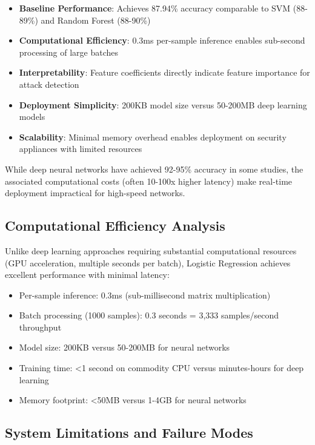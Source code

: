 \documentclass[conference]{IEEEtran}
\begin{document}
\begin{itemize}
    \item \textbf{Baseline Performance}: Achieves 87.94\% accuracy comparable to SVM (88-89\%) and Random Forest (88-90\%)
    \item \textbf{Computational Efficiency}: 0.3ms per-sample inference enables sub-second processing of large batches
    \item \textbf{Interpretability}: Feature coefficients directly indicate feature importance for attack detection
    \item \textbf{Deployment Simplicity}: 200KB model size versus 50-200MB deep learning models
    \item \textbf{Scalability}: Minimal memory overhead enables deployment on security appliances with limited resources
\end{itemize}

While deep neural networks have achieved 92-95\% accuracy in some studies, the associated computational costs (often 10-100x higher latency) make real-time deployment impractical for high-speed networks.

\subsection{Computational Efficiency Analysis}

Unlike deep learning approaches requiring substantial computational resources (GPU acceleration, multiple seconds per batch), Logistic Regression achieves excellent performance with minimal latency:

\begin{itemize}
    \item Per-sample inference: 0.3ms (sub-millisecond matrix multiplication)
    \item Batch processing (1000 samples): 0.3 seconds = 3,333 samples/second throughput
    \item Model size: 200KB versus 50-200MB for neural networks
    \item Training time: <1 second on commodity CPU versus minutes-hours for deep learning
    \item Memory footprint: <50MB versus 1-4GB for neural networks
\end{itemize}

\subsection{System Limitations and Failure Modes}
\end{document}
